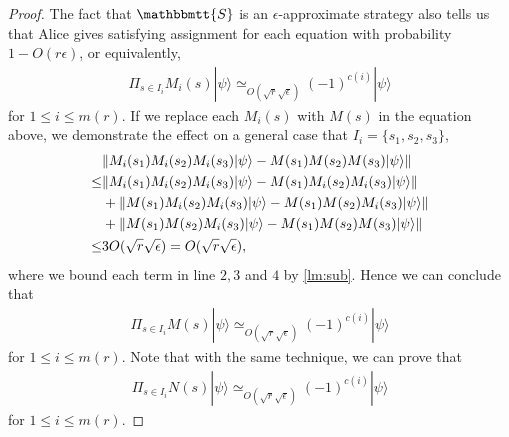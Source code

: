 \documentclass[11pt,letterpaper]{article}
\newcommand{\ket}[1]{|#1\rangle}
\DeclarePairedDelimiter{\norm}{\lVert}{\rVert}
\newcommand{\1}{\mathbb{1}}
\newcommand{\mr}{m(r)}
\newcommand{\bS}{\mathbbmtt{S}}
\newcommand{\ep}{\epsilon}
\newcommand{\se}{\sqrt{\epsilon}}
\newcommand{\sr}{\sqrt{r}}
\newcommand{\appd}[1]{\simeq_{#1}}
\theoremstyle{definition}
\begin{document}
\begin{proof}
The fact that $\bS$ is an $\ep$-approximate strategy also tells us that
Alice gives satisfying assignment for each equation with probability $1 - O(r\ep)$,
or equivalently,
\begin{align*}
	\Pi_{s \in I_i} M_{i}(s) \ket{\psi} \appd{O(\sr\se)} (-1)^{c(i)} \ket{\psi}
\end{align*}
for $1 \leq i \leq \mr$.
If we replace each $M_{i}(s)$ with $M(s)$ in the equation above, we demonstrate the effect on a
general case that $I_i = \{s_1, s_2, s_3\}$,
\begin{align*}
	&\norm{ M_{i}(s_1)M_{i}(s_2)M_{i}(s_3) \ket{\psi} - M(s_1)M(s_2)M(s_3) \ket{\psi}}\\
	\leq & \norm{M_{i}(s_1)M_{i}(s_2)M_{i}(s_3)\ket{\psi} - M(s_1)M_{i}(s_2)M_{i}(s_3) \ket{\psi}}\\
	&+ \norm{M(s_1)M_{i}(s_2)M_{i}(s_3) \ket{\psi} - M(s_1)M(s_2)M_{i}(s_3) \ket{\psi}} \\
	&+\norm{M(s_1)M(s_2)M_{i}(s_3) \ket{\psi} - M(s_1)M(s_2)M(s_3) \ket{\psi}}\\
	\leq &3O(\sr\se) = O(\sr\se),
\end{align*}
where we bound each term in line $2,3$ and $4$ by \cref{lm:sub}.
Hence we can conclude that 
\begin{align*}
	\Pi_{s \in I_i} M(s) \ket{\psi} \appd{O(\sr\se)} (-1)^{c(i)}\ket{\psi}
\end{align*}
for $1 \leq i \leq \mr$.
Note that with the same technique, we can prove that 
\begin{align*}
	\Pi_{s \in I_i} N(s) \ket{\psi} \appd{O(\sr\se)} (-1)^{c(i)}\ket{\psi}  
\end{align*}
for $1 \leq i \leq \mr$.
\end{proof}
\end{document}
